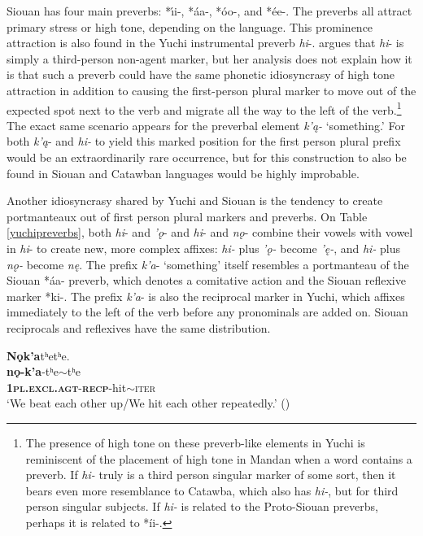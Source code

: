 \documentclass[output=paper]{LSP/langsci}
\begin{document}
{Siouan has four main preverbs: *\'\i i-, *\'aa-, *\'oo-, and *\'ee-. The preverbs all attract primary stress or high tone, depending on the language. This prominence attraction is also found in the Yuchi instrumental preverb \emph{hi}-. \citet{Linn2000} argues that \emph{hi}- is simply a third-person non-agent marker, but her analysis does not explain how it is that such a preverb could have the same phonetic idiosyncrasy of high tone attraction in addition to causing the first-person plural marker to move out of the expected spot next to the verb and migrate all the way to the left of the verb.\footnote{The presence of high tone on these preverb-like elements in Yuchi is reminiscent of the placement of high tone in Mandan when a word contains a preverb. If \emph{hi-} truly is a third person singular marker of some sort, then it bears even more resemblance to Catawba, which also has \emph{hi-}, but for third person singular subjects. If \emph{hi-} is related to the Proto-Siouan preverbs, perhaps it is related to *\'ii-.} 
The exact same scenario appears for the preverbal element \emph{k'\k{a}-} `something.' For both \emph{k'\k{a}}- and \emph{hi-} to yield this marked position for the first person plural prefix would be an extraordinarily rare occurrence, but for this construction to also be found in Siouan and Catawban languages would be highly improbable.

Another idiosyncrasy shared by Yuchi and Siouan is the tendency to create portmanteaux out of first person plural markers and preverbs. On Table \ref{yuchipreverbs}, both \emph{hi}- and \emph{'\k{o}}- and \emph{hi}- and \emph{n\k{o}}- combine their vowels with vowel in \emph{hi}- to create new, more complex affixes: \emph{hi-} plus \emph{'\k{o}-} become \emph{'\k{e}-}, and \emph{hi-} plus \emph{n\k{o}-} become \emph{n\k{e}}. The prefix \emph{k'a}- `something' itself resembles a portmanteau of the Siouan *\'aa- preverb, which denotes a comitative action and the Siouan reflexive marker *ki-. The prefix \emph{k'a}- is also the reciprocal marker in Yuchi, which affixes immediately to the left of the verb before any pronominals are added on. Siouan reciprocals and reflexives have the same distribution.

\ea \label{yuchimandan}
	\ea
	\glll  \textbf{N\k{o}k'a}tʰetʰe.\\ 
	\textbf{n\k{o}-k'a}-tʰe$\sim$tʰe\\
			\textbf{\textsc{1pl.excl.agt}}-\textbf{\textsc{recp}}-hit$\sim$\textsc{iter}\\ 
	\glt `We beat each other up/We hit each other repeatedly.' (\citealt[250]{Linn2000})
	
}
\end{document}
